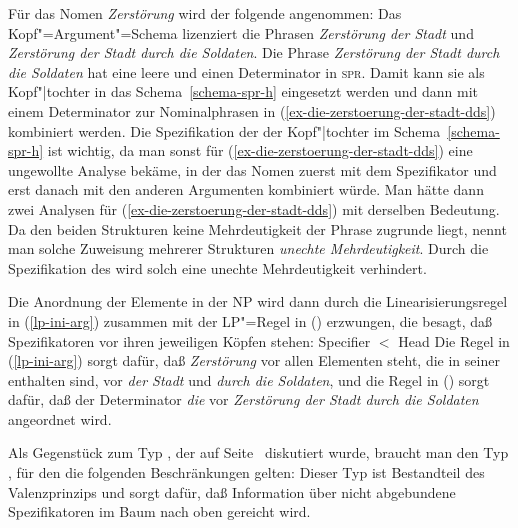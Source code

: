 \noindent
Für das Nomen \emph{Zerstörung} wird der folgende \catw angenommen:
\ea
{}
\z
Das Kopf"=Argument"=Schema lizenziert die Phrasen  \emph{Zerstörung der Stadt}
und  \emph{Zerstörung der Stadt durch die Soldaten}. Die Phrase  \emph{Zerstörung der Stadt durch
  die Soldaten} hat eine leere \subcatl und einen Determinator in \textsc{spr}. Damit kann sie als
Kopf"|tochter in das Schema~\ref{schema-spr-h} eingesetzt werden und dann mit einem Determinator zur
Nominalphrasen in (\ref{ex-die-zerstoerung-der-stadt-dds}) kombiniert werden. Die Spezifikation der \subcatl der Kopf"|tochter
im Schema~\ref{schema-spr-h} ist wichtig, da man sonst für (\ref{ex-die-zerstoerung-der-stadt-dds})
eine ungewollte Analyse bekäme, in der das Nomen zuerst mit dem Spezifikator und erst danach
mit den anderen Argumenten kombiniert würde. Man hätte dann zwei Analysen für
(\ref{ex-die-zerstoerung-der-stadt-dds}) mit derselben Bedeutung. Da den beiden Strukturen keine
Mehrdeutigkeit der Phrase zugrunde liegt, nennt man solche Zuweisung mehrerer Strukturen
\emph{unechte Mehrdeutigkeit}. Durch die Spezifikation des \subcatwes wird
solch eine unechte Mehrdeutigkeit verhindert.

Die Anordnung der Elemente in der NP wird dann durch die Linearisierungsregel in (\ref{lp-ini-arg})
zusammen mit der LP"=Regel in () erzwungen, die besagt, daß Spezifikatoren vor ihren
jeweiligen Köpfen stehen:
\ea
Specifier $<$ Head
\z
Die Regel in (\ref{lp-ini-arg}) sorgt dafür, daß \emph{Zerstörung} vor allen Elementen steht, die in seiner
\subcatl enthalten sind, \dash vor \emph{der Stadt} und \emph{durch die Soldaten}, und die Regel in
() sorgt dafür, daß der Determinator \emph{die} vor \emph{Zerstörung der Stadt durch die
Soldaten} angeordnet wird.

Als Gegenstück zum Typ , der auf Seite~\pageref{def-head-non-arg-phrase}
diskutiert wurde, braucht man den Typ , für den die folgenden Beschränkungen gelten:
\ea
\label{def-head-non-spr-phrase}
 \impl
{}
\z
Dieser Typ ist Bestandteil des Valenzprinzips und sorgt dafür,
daß Information über nicht abgebundene Spezifikatoren im Baum nach oben gereicht wird.


